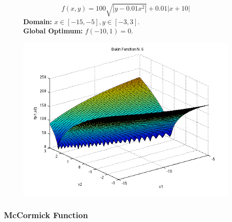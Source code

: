 \begin{figure}[H]
    \centering
    \begin{minipage}{0.65\textwidth}
        \begin{equation}
            f(x, y) = 100 \sqrt{|y - 0.01x^2|} + 0.01 |x + 10|
        \end{equation}
        \textbf{Domain:} \( x \in [-15, -5], y \in [-3, 3] \). \\
        \textbf{Global Optimum:} \( f(-10,1) = 0 \).
    \end{minipage}
    \hfill
    \begin{minipage}{0.3\textwidth}
        \centering
        \includegraphics[width=\textwidth]{figures/bukin_function.png}
        \label{fig:bukin}
    \end{minipage}
\end{figure}

\subsubsection{McCormick Function}

